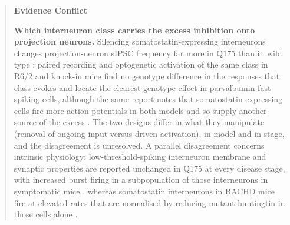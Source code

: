 \documentclass[11pt]{article}
\begin{document}
\begin{quote}
\noindent\textbf{Evidence Conflict}\par
\textbf{Which interneuron class carries the excess inhibition onto projection neurons.} Silencing somatostatin-expressing interneurons changes projection-neuron sIPSC frequency far more in Q175 than in wild type \citep{Holley2019}; paired recording and optogenetic activation of the same class in R6/2 and knock-in mice find no genotype difference in the responses that class evokes and locate the clearest genotype effect in parvalbumin fast-spiking cells, although the same report notes that somatostatin-expressing cells fire more action potentials in both models and so supply another source of the excess \citep{Cepeda2013}. The two designs differ in what they manipulate (removal of ongoing input versus driven activation), in model and in stage, and the disagreement is unresolved. A parallel disagreement concerns intrinsic physiology: low-threshold-spiking interneuron membrane and synaptic properties are reported unchanged in Q175 at every disease stage, with increased burst firing in a subpopulation of those interneurons in symptomatic mice \citep{Holley2018}, whereas somatostatin interneurons in BACHD mice fire at elevated rates that are normalised by reducing mutant huntingtin in those cells alone \citep{Fowler2026}.

\end{quote}
\end{document}
